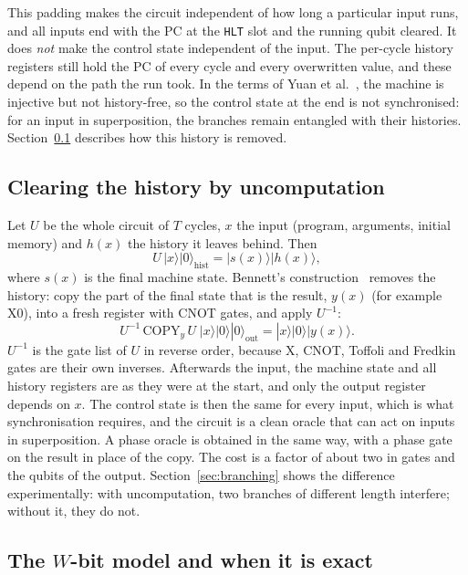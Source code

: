\documentclass[11pt]{article}
\begin{document}
This padding makes the circuit independent of how long a particular input runs, and all inputs end
with the PC at the \texttt{HLT} slot and the running qubit cleared. It does \emph{not} make the
control state independent of the input. The per-cycle history registers still hold the PC of every
cycle and every overwritten value, and these depend on the path the run took. In the terms of
Yuan et al.~\cite{yuan2024qcm}, the machine is injective but not history-free, so the control state
at the end is not synchronised: for an input in superposition, the branches remain entangled with
their histories. Section~\ref{sec:uncompute} describes how this history is removed.

\subsection{Clearing the history by uncomputation}
\label{sec:uncompute}

Let $U$ be the whole circuit of $T$ cycles, $x$ the input (program, arguments, initial memory) and
$h(x)$ the history it leaves behind. Then
\[
  U\,|x\rangle|0\rangle_{\mathrm{hist}} = |s(x)\rangle|h(x)\rangle ,
\]
where $s(x)$ is the final machine state. Bennett's construction~\cite{bennett1973} removes the
history: copy the part of the final state that is the result, $y(x)$ (for example X0), into a fresh
register with CNOT gates, and apply $U^{-1}$:
\[
  U^{-1}\,\mathrm{COPY}_{y}\,U\;|x\rangle|0\rangle|0\rangle_{\mathrm{out}}
  = |x\rangle|0\rangle|y(x)\rangle .
\]
$U^{-1}$ is the gate list of $U$ in reverse order, because X, CNOT, Toffoli and Fredkin gates are
their own inverses. Afterwards the input, the machine state and all history registers are as they
were at the start, and only the output register depends on $x$. The control state is then the same
for every input, which is what synchronisation requires, and the circuit is a clean oracle that can
act on inputs in superposition. A phase oracle is obtained in the same way, with a phase gate on the
result in place of the copy. The cost is a factor of about two in gates and the qubits of the output.
Section~\ref{sec:branching} shows the difference experimentally: with uncomputation, two branches of
different length interfere; without it, they do not.

\subsection{The \texorpdfstring{$W$}{W}-bit model and when it is exact}
\label{sec:wbit}
\end{document}
